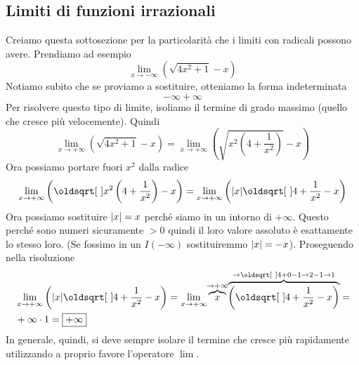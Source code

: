 \subsection{Limiti di funzioni irrazionali}
Creiamo questa sottosezione per la particolarità che i limiti con radicali possono avere. Prendiamo ad
esempio
\begin{equation*}
  \lim\limits_{x\to-\infty}\left(\sqrt{4x^2+1}-x\right)
\end{equation*}
Notiamo subito che se proviamo a sostituire, otteniamo la forma indeterminata
\begin{equation*}
  -\infty+\infty
\end{equation*}
Per risolvere questo tipo di limite, isoliamo il termine di grado massimo (quello che cresce più 
velocemente). Quindi
\begin{equation*}
  \lim\limits_{x\to+\infty}\left(\sqrt{4x^2+1}-x\right) = 
  \lim\limits_{x\to+\infty}\left(\sqrt{x^2\left(4+\frac{1}{x^2}\right)}-x\right)
\end{equation*}
Ora possiamo portare fuori $x^2$ dalla radice
\begin{equation*}
  \lim\limits_{x\to+\infty}\left(\sqrt{x^2\left(4+\frac{1}{x^2}\right)}-x\right) =
  \lim\limits_{x\to+\infty}\left(\abs{x}\sqrt{4+\frac{1}{x^2}}-x\right)
\end{equation*}
Ora possiamo sostituire $\lvert x\rvert = x$ perché siamo in un intorno di $+\infty$. Questo perché sono 
numeri sicuramente $>0$ quindi il loro valore assoluto è esattamente lo stesso loro. (Se fossimo in un
$I(-\infty)$ sostituiremmo $\lvert x\rvert = -x$). Proseguendo nella risoluzione
\begin{align*}
  &\lim\limits_{x\to+\infty}\left(\abs{x}\sqrt{4+\frac{1}{x^2}}-x\right)=
  \lim\limits_{x\to+\infty}\overbrace{x}^{\mathclap{\to+\infty}}
  \overbrace{\left(\sqrt{4+\frac{1}{x^2}}-x\right)}^{\mathclap{\to\sqrt{4+0}-1\to2-1\to1}}=\\
  &+\infty\cdot1 = \boxed{+\infty}
\end{align*}
In generale, quindi, si deve sempre isolare il termine che cresce più rapidamente utilizzando a proprio
favore l'operatore $\lim$.

